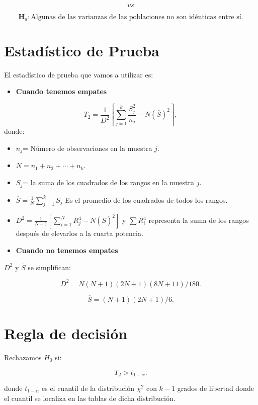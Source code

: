 \documentclass[
  a4paper,
  oneside,
  openany]{book}
\providecommand{\tightlist}{%
  \setlength{\itemsep}{0pt}\setlength{\parskip}{0pt}}
\begin{document}
\[vs\]

\[\textbf{H}_a: \mbox{Algunas de las varianzas de las poblaciones no son idénticas entre sí.}\]

\hypertarget{estaduxedstico-de-prueba-8}{%
\section{Estadístico de Prueba}\label{estaduxedstico-de-prueba-8}}

El estadístico de prueba que vamos a utilizar es:

\begin{itemize}
\tightlist
\item
  \textbf{Cuando tenemos empates}
\end{itemize}

\[T_{2}= \frac{1}{D^2}\left[\sum_{j=1}^{k}\frac{S_{j}^2}{n_j}-N(\overline{S})^2\right],\]
donde:

\begin{itemize}
\item
  \(n_{j}\)= Número de observaciones en la muestra \(j\).
\item
  \(N= n_{1}+n_{2}+\cdots+n_{k}\).
\item
  \(S_{j}\)= la suma de los cuadrados de los rangos en la muestra \(j\).
\item
  \(\overline{S}= \frac{1}{N}\sum_{j=1}^{k}S_{j}\) Es el promedio de los cuadrados de todos los rangos.
\item
  \(D^2=\frac{1}{N-1}\left[\sum_{i=1}^{N}R^4_{j}-N(\overline{S})^2\right]\) y \(\sum{R_{i}^4}\) representa la suma de los rangos después de elevarlos a la cuarta potencia.
\item
  \textbf{Cuando no tenemos empates}
\end{itemize}

\(D^2\) y \(\overline{S}\) se simplifican:

\[D^2=N(N+1)(2N+1)(8N+11)/180.\]

\[\overline{S}=(N+1)(2N+1)/6.\]

\hypertarget{regla-de-decisiuxf3n-20}{%
\section{Regla de decisión}\label{regla-de-decisiuxf3n-20}}

Rechazamos \(H_0\) si:

\[T_{2}>t_{1-\alpha}.\]

donde \(t_{1-\alpha}\) es el cuantil de la distribución \(\chi^2\) con \(k-1\) grados de libertad donde el cuantil se localiza en las tablas de dicha distribución.
\end{document}
